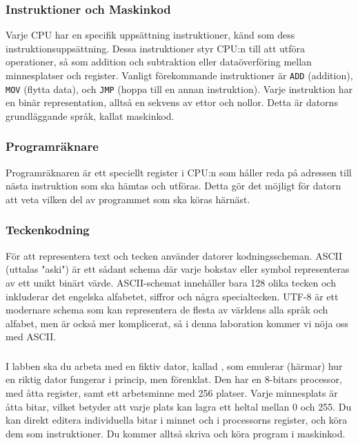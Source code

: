 \subsubsection{Instruktioner och Maskinkod}
Varje CPU har en specifik uppsättning instruktioner, känd som dess instruktionsuppsättning. Dessa instruktioner styr CPU:n till att utföra operationer, så som addition och subtraktion eller dataöverföring mellan minnesplatser och register. Vanligt förekommande instruktioner är \texttt{ADD} (addition), \texttt{MOV} (flytta data), och \texttt{JMP} (hoppa till en annan instruktion). Varje instruktion har en binär representation, alltså en sekvens av ettor och nollor. Detta är datorns grundläggande språk, kallat maskinkod.

\subsubsection{Programräknare}
Programräknaren är ett speciellt register i CPU:n som håller reda på adressen till nästa instruktion som ska hämtas och utföras. Detta gör det möjligt för datorn att veta vilken del av programmet som ska köras härnäst.

\subsubsection{Teckenkodning}
För att representera text och tecken använder datorer kodningsscheman. ASCII (uttalas "aski") är ett sådant schema där varje bokstav eller symbol representeras av ett unikt binärt värde. ASCII-schemat innehåller bara 128 olika tecken och inkluderar det engelska alfabetet, siffror och några specialtecken. UTF-8 är ett modernare schema som kan representera de flesta av världens alla språk och alfabet, men är också mer komplicerat, så i denna laboration kommer vi nöja oss med ASCII.

\subsubsection{\progname{}}
I labben ska du arbeta med en fiktiv dator, kallad \progname{}, som emulerar (härmar) hur en riktig dator fungerar i princip, men förenklat.
Den har en 8-bitars processor, med åtta register, samt ett arbetsminne med 256 platser. Varje minnesplats är åtta bitar, vilket betyder att varje plats kan lagra ett heltal mellan 0 och 255.
Du kan direkt editera individuella bitar i minnet och i processorns register, och köra dem som instruktioner. Du kommer alltså skriva och köra program i maskinkod.

